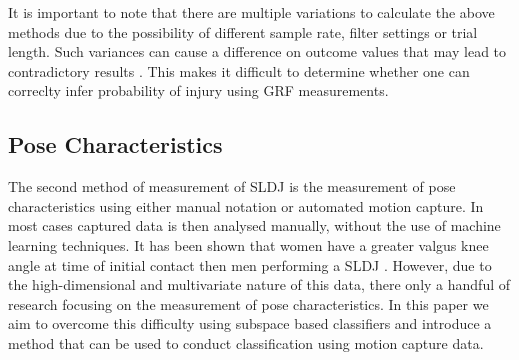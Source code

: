 It is important to note that there are multiple variations to calculate the above methods due to the possibility of different sample rate, filter settings or trial length. Such variances can cause a difference on outcome values that may lead to contradictory results \cite{Fransz2015TimeValues}. This makes it difficult to determine whether one can correclty infer probability of injury using GRF measurements.

\subsection{Pose Characteristics}
The second method of measurement of SLDJ is the measurement of pose characteristics using either manual notation or automated motion capture. In most cases captured data is then analysed manually, without the use of machine learning techniques. It has been shown that women have a greater valgus knee angle at time of initial contact then men performing a SLDJ \cite{Russell2006SexJump}. However, due to the high-dimensional and multivariate nature of this data, there only a handful of research focusing on the measurement of pose characteristics. In this paper we aim to overcome this difficulty using subspace based classifiers and introduce a method that can be used to conduct classification using motion capture data.

